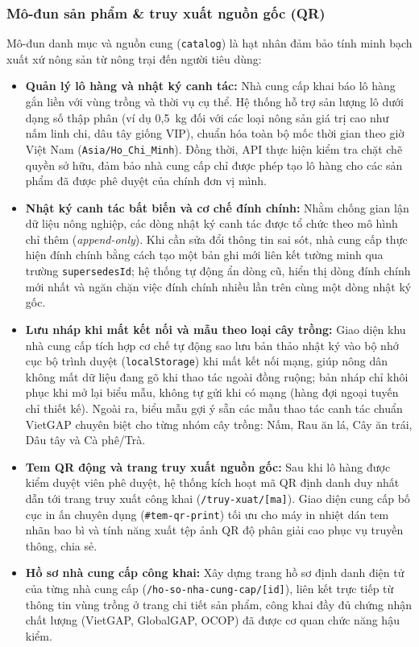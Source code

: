 \subsubsection*{Mô-đun sản phẩm \& truy xuất nguồn gốc (QR)}
Mô-đun danh mục và nguồn cung (\texttt{catalog}) là hạt nhân đảm bảo tính minh bạch xuất xứ nông sản từ nông trại đến người tiêu dùng:
\begin{itemize}
    \item \textbf{Quản lý lô hàng và nhật ký canh tác:} Nhà cung cấp khai báo lô hàng gắn liền với vùng trồng và thời vụ cụ thể. Hệ thống hỗ trợ sản lượng lô dưới dạng số thập phân (ví dụ 0,5~kg đối với các loại nông sản giá trị cao như nấm linh chi, dâu tây giống VIP), chuẩn hóa toàn bộ mốc thời gian theo giờ Việt Nam (\texttt{Asia/Ho\_Chi\_Minh}). Đồng thời, API thực hiện kiểm tra chặt chẽ quyền sở hữu, đảm bảo nhà cung cấp chỉ được phép tạo lô hàng cho các sản phẩm đã được phê duyệt của chính đơn vị mình.
    \item \textbf{Nhật ký canh tác bất biến và cơ chế đính chính:} Nhằm chống gian lận dữ liệu nông nghiệp, các dòng nhật ký canh tác được tổ chức theo mô hình chỉ thêm (\emph{append-only}). Khi cần sửa đổi thông tin sai sót, nhà cung cấp thực hiện đính chính bằng cách tạo một bản ghi mới liên kết tường minh qua trường \texttt{supersedesId}; hệ thống tự động ẩn dòng cũ, hiển thị dòng đính chính mới nhất và ngăn chặn việc đính chính nhiều lần trên cùng một dòng nhật ký gốc.
    \item \textbf{Lưu nháp khi mất kết nối và mẫu theo loại cây trồng:} Giao diện khu nhà cung cấp tích hợp cơ chế tự động sao lưu bản thảo nhật ký vào bộ nhớ cục bộ trình duyệt (\texttt{localStorage}) khi mất kết nối mạng, giúp nông dân không mất dữ liệu đang gõ khi thao tác ngoài đồng ruộng; bản nháp chỉ khôi phục khi mở lại biểu mẫu, không tự gửi khi có mạng (hàng đợi ngoại tuyến chỉ thiết kế). Ngoài ra, biểu mẫu gợi ý sẵn các mẫu thao tác canh tác chuẩn VietGAP chuyên biệt cho từng nhóm cây trồng: Nấm, Rau ăn lá, Cây ăn trái, Dâu tây và Cà phê/Trà.
    \item \textbf{Tem QR động và trang truy xuất nguồn gốc:} Sau khi lô hàng được kiểm duyệt viên phê duyệt, hệ thống kích hoạt mã QR định danh duy nhất dẫn tới trang truy xuất công khai (\texttt{/truy-xuat/[ma]}). Giao diện cung cấp bố cục in ấn chuyên dụng (\texttt{\#tem-qr-print}) tối ưu cho máy in nhiệt dán tem nhãn bao bì và tính năng xuất tệp ảnh QR độ phân giải cao phục vụ truyền thông, chia sẻ.
    \item \textbf{Hồ sơ nhà cung cấp công khai:} Xây dựng trang hồ sơ định danh điện tử của từng nhà cung cấp (\texttt{/ho-so-nha-cung-cap/[id]}), liên kết trực tiếp từ thông tin vùng trồng ở trang chi tiết sản phẩm, công khai đầy đủ chứng nhận chất lượng (VietGAP, GlobalGAP, OCOP) đã được cơ quan chức năng hậu kiểm.
\end{itemize}

